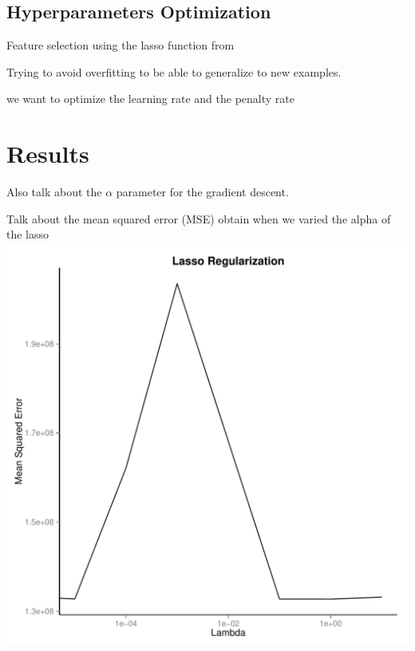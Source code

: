 \documentclass[conference]{IEEEtran}\usepackage[]{graphicx}\usepackage[]{color}
\makeatletter
\def\maxwidth{ %
  \ifdim\Gin@nat@width>\linewidth
    \linewidth
  \else
    \Gin@nat@width
  \fi
}
\newenvironment{knitrout}{}{} %
\makeatother
\begin{document}
\subsection{Hyperparameters Optimization}

Feature selection using the lasso function from \cite{scikit-learn}

Trying to avoid overfitting to be able to generalize to new examples.

we want to optimize the learning rate and the penalty rate

\section{Results}

Also talk about the $\alpha$ parameter for the gradient descent.

Talk about the mean squared error (MSE) obtain when we varied the alpha of the lasso 
\begin{knitrout}
\color{fgcolor}
\includegraphics[width=\maxwidth]{figure/unnamed-chunk-2-1} 

\end{knitrout}
\end{document}

